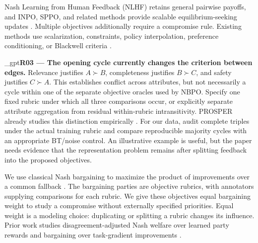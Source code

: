 \documentclass{article}
\makeatletter
\newif\ifshowreviews
\let\revieworiginalref\ref
\newcommand{\reviewref}[1]{%
  \@ifundefined{r@#1}{\textnormal{[original-draft ref.: \texttt{\detokenize{#1}}]}}%
  {\revieworiginalref{#1}}}
\let\ref\reviewref
\newcommand{\reviewresponse}[1]{%
  \ifshowreviews
  \par\begingroup\color{blue!65!black}\hypersetup{allcolors=blue!65!black}\emergencystretch=2em%
  \noindent\textbf{Response:} #1\par\endgroup
  \fi}
\theoremstyle{remark}
\theoremstyle{plain}
\makeatother
\begin{document}
Nash Learning from Human Feedback (NLHF) retains general pairwise payoffs, and INPO, SPPO, and related methods provide scalable equilibrium-seeking updates \citep{munos2024nash,zhang2025iterative,wu2025sppo,calandriello2024online,rosset2024direct,zhou2025egpo}. Multiple objectives additionally require a compromise rule. Existing methods use scalarization, constraints, policy interpolation, preference conditioning, or Blackwell criteria \citep{zhou2024beyond,rame2023rewarded,zhong2024panacea,agnihotri2026mopo,zhang2026prosper}.

\kekim_gpt{\textbf{R03 --- The opening cycle currently changes the criterion between edges.} Relevance justifies $A\succ B$, completeness justifies $B\succ C$, and safety justifies $C\succ A$. This establishes conflict across attributes, but not necessarily a cycle within one of the separate objective oracles used by NBPO. Specify one fixed rubric under which all three comparisons occur, or explicitly separate attribute aggregation from residual within-rubric intransitivity. PROSPER already studies this distinction empirically \citep{zhang2026prosper}. For our data, audit complete triples under the actual training rubric and compare reproducible majority cycles with an appropriate BT/noise control. An illustrative example is useful, but the paper needs evidence that the representation problem remains after splitting feedback into the proposed objectives.}
\reviewresponse{\textbf{R03 --- Partially addressed.} The illustrative cycle uses one fixed helpfulness rubric. Cross-objective disagreement is separated from within-rubric cycles throughout the experiments. The completed UF audit yields no eligible order-robust witness. The planned dataset audit in Appendix~\ref{app:dataset_stress_test} fixes the rubric and candidate count and reports repeatability and coverage before selecting a training panel.}


We use classical Nash bargaining to maximize the product of improvements over a common fallback \citep{nash1950}. The bargaining parties are objective rubrics, with annotators supplying comparisons for each rubric. We give these objectives equal bargaining weight to study a compromise without externally specified priorities. Equal weight is a modeling choice: duplicating or splitting a rubric changes its influence. Prior work studies disagreement-adjusted Nash welfare over learned party rewards and bargaining over task-gradient improvements \citep{zhong2024nashwelfare,navon2022nashmtl}.
\end{document}
